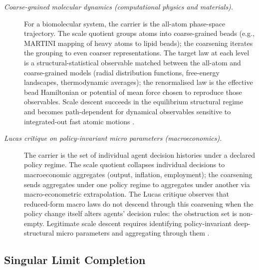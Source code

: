 \documentclass[11pt]{article}
\theoremstyle{definition}
\begin{document}
\begin{description}
\item[\emph{Coarse-grained molecular dynamics
(computational physics and materials).}]
For a biomolecular system, the carrier is the
all-atom phase-space trajectory.  The scale quotient
groups atoms into coarse-grained beads (e.g.,
MARTINI mapping of heavy atoms to lipid beads); the
coarsening iterates the grouping to even coarser
representations.  The target law at each level is a
structural-statistical observable matched between
the all-atom and coarse-grained models (radial
distribution functions, free-energy landscapes,
thermodynamic averages); the renormalised law is the
effective bead Hamiltonian or potential of mean force
chosen to reproduce those observables.  Scale descent
succeeds in the equilibrium structural regime and
becomes path-dependent for dynamical observables
sensitive to integrated-out fast atomic motions
\citep{Voth2008CoarseGraining}.

\item[\emph{Lucas critique on policy-invariant micro
parameters (macroeconomics).}]
The carrier is the set of individual agent decision
histories under a declared policy regime.  The scale
quotient collapses individual decisions to
macroeconomic aggregates (output, inflation,
employment); the coarsening sends aggregates under
one policy regime to aggregates under another via
macro-econometric extrapolation.  The Lucas critique
observes that reduced-form macro laws do not descend
through this coarsening when the policy change
itself alters agents' decision rules: the obstruction
set is non-empty.  Legitimate scale descent requires
identifying policy-invariant deep-structural micro
parameters and aggregating through them
\citep{Lucas1976Critique}.
\end{description}

\subsection{Singular Limit Completion}\label{sec:self-reference-limits:singular-limit}
\end{document}
